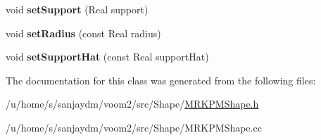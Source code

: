 \begin{DoxyCompactItemize}
\item 
\hypertarget{classvoom_1_1_m_r_k_p_m_shape_a8d7c436956ceb482e6acb0564ead5c4e}{
void {\bfseries setSupport} (Real support)}
\label{classvoom_1_1_m_r_k_p_m_shape_a8d7c436956ceb482e6acb0564ead5c4e}

\item 
\hypertarget{classvoom_1_1_m_r_k_p_m_shape_a28903ffc3acf8e78dd5ec4120bd0f7f0}{
void {\bfseries setRadius} (const Real radius)}
\label{classvoom_1_1_m_r_k_p_m_shape_a28903ffc3acf8e78dd5ec4120bd0f7f0}

\item 
\hypertarget{classvoom_1_1_m_r_k_p_m_shape_ad74e97c387e08a728bdec1951eca92e1}{
void {\bfseries setSupportHat} (const Real supportHat)}
\label{classvoom_1_1_m_r_k_p_m_shape_ad74e97c387e08a728bdec1951eca92e1}

\end{DoxyCompactItemize}


The documentation for this class was generated from the following files:\begin{DoxyCompactItemize}
\item 
/u/home/s/sanjaydm/voom2/src/Shape/\hyperlink{_m_r_k_p_m_shape_8h}{MRKPMShape.h}\item 
/u/home/s/sanjaydm/voom2/src/Shape/MRKPMShape.cc\end{DoxyCompactItemize}

